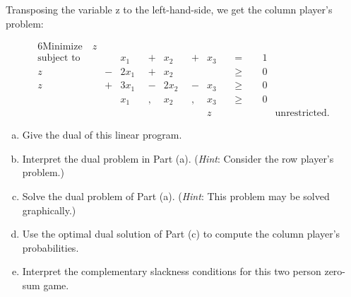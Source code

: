 \documentclass[12pt]{amsart}
\begin{document}
Transposing the variable z to the left-hand-side, we get the column player's 
problem: 

\begin{alignat*}{6}
\text{Minimize}\quad   z  & {} {} &\qquad& {} {} &\qquad& {} {} &\qquad&{}\qquad    {}  &   & \\
\text{subject to}\quad\,\ & {} {} &  x_1& {}+{} &  x_2& {}+{} & x_3  &{} =  {}  & 1 & \\
	                   z  & {}-{} & 2x_1& {}+{} &  x_2& {} {} &      &{}\geq{}  & 0 & \\
	                   z  & {}+{} & 3x_1& {}-{} & 2x_2& {}-{} & x_3  &{}\geq{}  & 0 & \\
	                      & {} {} &  x_1&,{} {} &  x_2&,{} {} & x_3  &{}\geq{}  & 0 & \\
	                      & {} {} &     & {} {} &     & {} {} &   z  &{}    {}  &   & \text{unrestricted}. 
\end{alignat*}

\begin{enumerate}[a.]
	\item Give the dual of this linear program. 
	\item Interpret the dual problem in Part (a). (\textit{Hint}: Consider the row player's problem.) 
	\item Solve the dual problem of Part (a). (\textit{Hint}: This problem may be solved graphically.) 
	\item Use the optimal dual solution of Part (c) to compute the column player's probabilities. 
	\item Interpret the complementary slackness conditions for this two person zero-sum game.
\end{enumerate}
\end{document}
